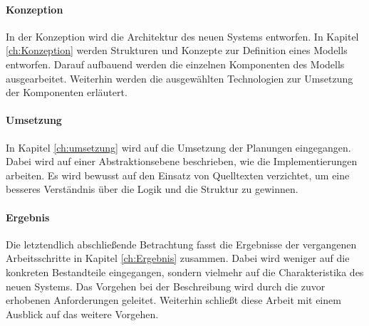\paragraph{Konzeption} In der Konzeption wird die Architektur des neuen Systems entworfen. In Kapitel \ref{ch:Konzeption} werden Strukturen und Konzepte zur Definition eines Modells entworfen. Darauf aufbauend werden die einzelnen Komponenten des Modells ausgearbeitet. Weiterhin werden die ausgewählten Technologien zur Umsetzung der Komponenten erläutert. 

\paragraph{Umsetzung} In Kapitel \ref{ch:umsetzung} wird auf die Umsetzung der Planungen eingegangen. Dabei wird auf einer Abstraktionsebene beschrieben, wie die Implementierungen arbeiten. Es wird bewusst auf den Einsatz von Quelltexten verzichtet, um eine besseres Verständnis über die Logik und die Struktur zu gewinnen. 

\paragraph{Ergebnis} Die letztendlich abschließende Betrachtung fasst die Ergebnisse der vergangenen Arbeitsschritte in Kapitel \ref{ch:Ergebnis} zusammen. Dabei wird weniger auf die konkreten Bestandteile eingegangen, sondern vielmehr auf die Charakteristika des neuen Systems. Das Vorgehen bei der Beschreibung wird durch die zuvor erhobenen Anforderungen geleitet. Weiterhin schließt diese Arbeit mit einem Ausblick auf das weitere Vorgehen. 

